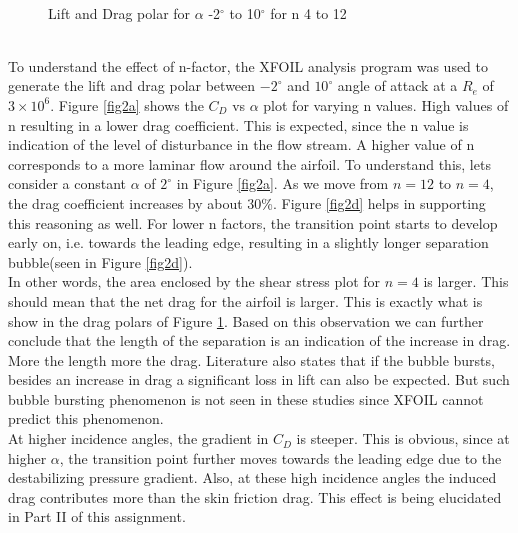 \documentclass[main.tex]{subfiles}
\begin{document}
\begin{figure}[h!]
{        \label{fig2c} } \hspace*{-1.2em}
     \\\vspace*{-0.5em}
    \caption{Lift and Drag polar for $\alpha$  -2$^{\circ}$ to 10$^{\circ}$ for n 4 to 12}
    \label{fig2}
\end{figure}
\pagebreak
\\To understand the effect of n-factor, the XFOIL analysis program was used to generate the lift and drag polar between $-2^{\circ}$ and $10^{\circ}$ angle of attack at a $R_e$ of $3\times10^{6}$. Figure \ref{fig2a} shows the $C_D$ vs $\alpha$ plot for varying n values. High values of n resulting in a lower drag coefficient. This is expected, since the n value is indication of the level of disturbance in the flow stream. A higher value of n corresponds to a more laminar flow around the airfoil. To understand this, lets consider a constant $\alpha$ of $2^{\circ}$ in Figure \ref{fig2a}. As we move from $n=12$ to $n=4$, the drag coefficient increases by about 30\%. Figure \ref{fig2d} helps in supporting this reasoning as well. For lower n factors, the transition point starts to develop early on, i.e. towards the leading edge, resulting in a slightly longer separation bubble(seen in Figure \ref{fig2d}). 
\\\indent In other words, the area enclosed by the shear stress plot for $n=4$ is larger. This should mean that the net drag for the airfoil is larger. This is exactly what is show in the drag polars of Figure \ref{fig2}. Based on this observation we can further conclude that the length of the separation is an indication of the increase in drag. More the length more the drag. Literature also states that if the bubble bursts, besides an increase in drag a significant loss in lift can also be expected. But such bubble bursting phenomenon is not seen in these studies since XFOIL cannot predict this phenomenon. 
\\\indent At higher incidence angles, the gradient in $C_D$ is steeper. This is obvious, since at higher $\alpha$, the transition point further moves towards the leading edge due to the destabilizing pressure gradient. Also, at these high incidence angles the induced drag contributes more than the skin friction drag. This effect is being elucidated in Part II of this assignment.\vspace*{-0.9em}
\end{document}

